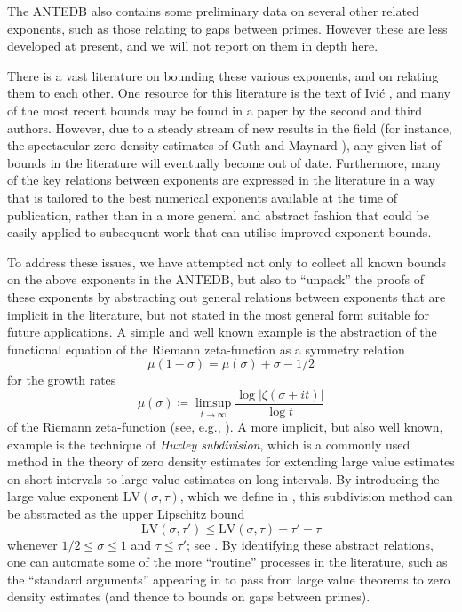 \documentclass[a4paper, 10pt]{amsart}
\newcommand{\LV}{\mathrm{LV}}
\begin{document}
The ANTEDB also contains some preliminary data on several other related exponents, such as those relating to gaps between primes. However these are less developed at present, and we will not report on them in depth here.

There is a vast literature on bounding these various exponents, and on relating them to each other.  One  resource for this literature is the text of Ivi\'{c} \cite{ivic}, and many of the most recent bounds may be found in a paper \cite{trudgian-yang} by the second and third authors.  However, due to a steady stream of new results in the field (for instance, the spectacular zero density estimates of Guth and Maynard \cite{guth-maynard}), any given list of bounds in the literature will eventually become out of date.  Furthermore, many of the key relations between exponents are expressed in the literature in a way that is tailored to the best numerical exponents available at the time of publication, rather than in a more general and abstract fashion that could be easily applied to subsequent work that can utilise improved exponent bounds.

To address these issues, we have attempted not only to collect all known bounds on the above exponents in the ANTEDB, but also to ``unpack'' the proofs of these exponents by abstracting out general relations between exponents that are implicit in the literature, but not stated in the most general form suitable for future applications.  A simple and well known example is the abstraction of the functional equation of the Riemann zeta-function as a symmetry relation
\begin{equation}\label{mu-func}
    \mu(1-\sigma) = \mu(\sigma) + \sigma - 1/2
\end{equation}
for the growth rates
\begin{equation}\label{mu-def}
    \mu(\sigma) \coloneqq \limsup_{t \to \infty} \frac{\log |\zeta(\sigma+it)|}{\log t}
\end{equation}
of the Riemann zeta-function (see, e.g., \cite[(1.23), (1.25)]{ivic}).  A more implicit, but also well known, example is the technique of \emph{Huxley subdivision}, which is a commonly used method in the theory of zero density estimates for extending large value estimates on short intervals to large value estimates on long intervals.  By introducing the large value exponent $\LV(\sigma,\tau)$, which we define in , this subdivision method can be abstracted as the upper Lipschitz bound
\begin{equation*}\label{subdivision}
 \LV(\sigma,\tau') \leq \LV(\sigma,\tau) + \tau' - \tau
\end{equation*}
whenever $1/2 \leq \sigma \leq 1$ and $\tau \leq \tau'$; see .  By identifying these abstract relations, one can automate some of the more ``routine'' processes in the literature, such as the ``standard arguments'' appearing in \cite{guth-maynard} to pass from large value theorems to zero density estimates (and thence to bounds on gaps between primes).
\end{document}
